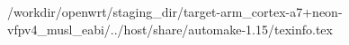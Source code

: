 /workdir/openwrt/staging_dir/target-arm_cortex-a7+neon-vfpv4_musl_eabi/../host/share/automake-1.15/texinfo.tex